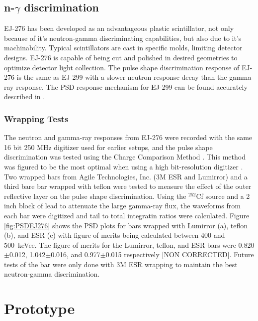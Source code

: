 \subsection{n-${\mathit \gamma}$ discrimination} \label{PSDsection}
EJ-276 has been developed as an advantageous plastic scintillator, not only because of it's neutron-gamma discriminating capabilities, but also due to it's machinability. Typical scintillators are cast in specific molds, limiting detector designs. EJ-276 is capable of being cut and polished in desired geometries to optimize detector light collection. The pulse shape discrimination response of EJ-276 is the same as EJ-299 with a slower neutron response decay than the gamma-ray response. The PSD response mechanism for EJ-299 can be found accurately described in \cite{Zaitseva2012}.
\subsubsection{Wrapping Tests}
 The neutron and gamma-ray responses from EJ-276 were recorded with the same 16 bit 250 MHz digitizer used for earlier setups, and the pulse shape discrimination was tested using the Charge Comparison Method \cite{CCMPSD}. This method was figured to be the most optimal when using a high bit-resolution digitizer \cite{HighResPSD}.
Two wrapped bars from Agile Technologies, Inc. (3M\textsuperscript{\texttrademark} ESR and Lumirror\textsuperscript{\texttrademark}) and a third bare bar wrapped with teflon were tested to measure the effect of the outer reflective layer on the pulse shape discrimination. Using the $^{252}$Cf source and a 2 inch block of lead to attenuate the large gamma-ray flux, the waveforms from each bar were digitized and tail to total integratin ratios were calculated. Figure \ref{fig:PSDEJ276} shows the PSD plots for bars wrapped with Lumirror\textsuperscript{\texttrademark} (a), teflon (b), and ESR (c) with figure of merits being calculated between 400 and 500~keVee. The figure of merits for the Lumirror\textsuperscript{\texttrademark}, teflon, and ESR bars were 0.820$\pm$0.012, 1.042$\pm$0.016, and 0.977$\pm$0.015 respectively [NON CORRECTED]. Future tests of the bar were only done with 3M\textsuperscript{\texttrademark} ESR wrapping to maintain the best neutron-gamma discrimination.

\section{Prototype} \label{Prototype}

